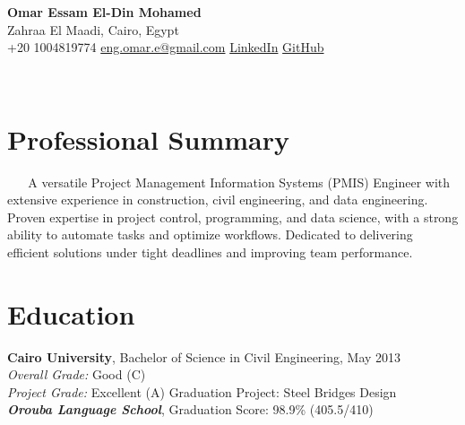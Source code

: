 \documentclass[10pt, letterpaper]{article}
\begin{document}
\begin{center}
    {\LARGE \textbf{Omar Essam El-Din Mohamed}} \\
    {Zahraa El Maadi, Cairo, Egypt} \\
    {\faPhone* \hspace{0.2cm} +20 1004819774} \hspace{1cm}
    {\href{mailto:eng.omar.e@gmail.com}{\faEnvelope[regular] \hspace{0.2cm} eng.omar.e@gmail.com}} \hspace{1cm}
            {\href{https://www.linkedin.com/in/omar-essam-b602279b}{\faLinkedin \hspace{0.2cm} LinkedIn}} \hspace{1cm}
    {\href{https://github.com/omare32}{\faGithub \hspace{0.2cm} GitHub}}
\end{center}
    
    \section{Professional Summary}
    A versatile Project Management Information Systems (PMIS) Engineer with extensive experience in construction, civil engineering, and data engineering. Proven expertise in project control, programming, and data science, with a strong ability to automate tasks and optimize workflows. Dedicated to delivering efficient solutions under tight deadlines and improving team performance.

\section{Education}
\textbf{Cairo University}, Bachelor of Science in Civil Engineering, May 2013 \\
\textit{Overall Grade:} Good (C) \\
\textit{Project Grade:} Excellent (A) {Graduation Project:} Steel Bridges Design \\
\textit

\textbf{Orouba Language School}, Graduation Score: 98.9\% (405.5/410)
\end{document}
